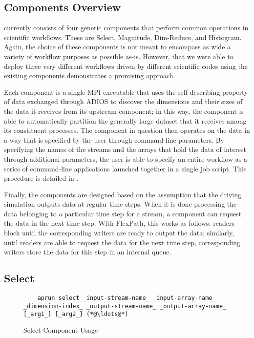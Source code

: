 \subsection{Components Overview}

\sys currently consists of four generic components
that perform common operations
in scientific workflows. These are Select,
Magnitude, Dim-Reduce, and Histogram.
Again, the choice of these components
is not meant to encompass as wide a variety
of workflow purposes as possible as-is.
However, that we were able to deploy three
very different workflows driven by different
scientific codes using the existing \sys
components demonstrates a promising approach.

Each component is a single MPI executable
that uses the self-describing property
of data exchanged through ADIOS
to discover the dimensions and their sizes of
the data it receives from its upstream component;
in this way, the component is able to
automatically partition the generally
large dataset that it receives
among its constituent processes.
The component in question
then operates on the data
in a way that is specified by the user
through command-line parameters.
By specifying the names of the streams
and the arrays that hold the data
of interest through additional parameters, the
user is able to specify an entire
workflow as a series of command-line
applications launched together in a single
job script.
This procedure is detailed in .

Finally, the components are designed
based on the assumption that the driving simulation
outputs data at regular time steps.
When it is done processing the data belonging
to a particular time step for a stream, a component
can request the data in the next time step.
With FlexPath, this works as follows:
readers block until
the corresponding writers
are ready to output the data;
similarly, until readers are able to
request the data for the next time step,
corresponding writers store the data for
this step in an internal queue.

\subsection{Select}

\begin{figure}
  \begin{lstlisting}
    aprun select _input-stream-name_ _input-array-name_ _dimension-index_ _output-stream-name_ _output-array-name_ [_arg1_] [_arg2_] (*@\ldots@*)
  \end{lstlisting}
  \caption{Select Component Usage}
  \label{fig:select}
\end{figure}

